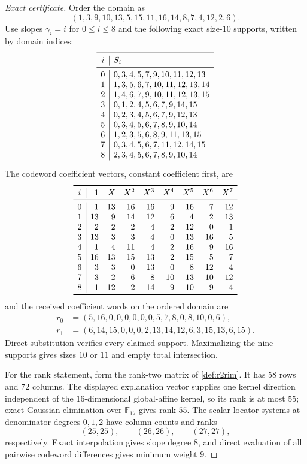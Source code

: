 \documentclass[11pt,a4paper]{amsart}
\numberwithin{equation}{section}
\theoremstyle{remark}
\newcommand{\F}{\mathbb F}\newcommand{\B}{\mathbb B}\newcommand{\K}{\mathbb K}\newcommand{\Z}{\mathbb Z}
\begin{document}
\begin{proof}[Exact certificate]
Order the domain as
\[
 (1,3,9,10,13,5,15,11,16,14,8,7,4,12,2,6).
\]
Use slopes $\gamma_i=i$ for $0\le i\le8$ and the following exact size-$10$ supports, written by domain indices:
\[
\begin{array}{c|l}
\toprule
 i&S_i\\
\midrule
0&0,3,4,5,7,9,10,11,12,13\\
1&1,3,5,6,7,10,11,12,13,14\\
2&1,4,6,7,9,10,11,12,13,15\\
3&0,1,2,4,5,6,7,9,14,15\\
4&0,2,3,4,5,6,7,9,12,13\\
5&0,3,4,5,6,7,8,9,10,14\\
6&1,2,3,5,6,8,9,11,13,15\\
7&0,3,4,5,6,7,11,12,14,15\\
8&2,3,4,5,6,7,8,9,10,14\\
\bottomrule
\end{array}
\]
The codeword coefficient vectors, constant coefficient first, are
\[
\begin{array}{c|rrrrrrrr}
\toprule
 i&1&X&X^2&X^3&X^4&X^5&X^6&X^7\\
\midrule
0&1&13&16&16&9&16&7&12\\
1&13&9&14&12&6&4&2&13\\
2&2&2&2&4&2&12&0&1\\
3&13&3&3&4&0&13&16&5\\
4&1&4&11&4&2&16&9&16\\
5&16&13&15&13&2&15&5&7\\
6&3&3&0&13&0&8&12&4\\
7&3&2&6&8&10&13&10&12\\
8&1&12&2&14&9&10&9&4\\
\bottomrule
\end{array}
\]
and the received coefficient words on the ordered domain are
\[
\begin{aligned}
 r_0&=(5,16,0,0,0,0,0,0,5,7,8,0,8,10,0,6),\\
 r_1&=(6,14,15,0,0,0,2,13,14,12,6,3,15,13,6,15).
\end{aligned}
\]
Direct substitution verifies every claimed support.  Maximalizing the nine supports gives sizes $10$ or $11$ and empty total intersection.

For the rank statement, form the rank-two matrix of \cref{def:r2rim}.  It has $58$ rows and $72$ columns.  The displayed explanation vector supplies one kernel direction independent of the $16$-dimensional global-affine kernel, so its rank is at most $55$; exact Gaussian elimination over $\F_{17}$ gives rank $55$.  The scalar-locator systems at denominator degrees $0,1,2$ have column counts and ranks
\[
 (25,25),\qquad(26,26),\qquad(27,27),
\]
respectively.  Exact interpolation gives slope degree $8$, and direct evaluation of all pairwise codeword differences gives minimum weight $9$.


\end{proof}
\end{document}
